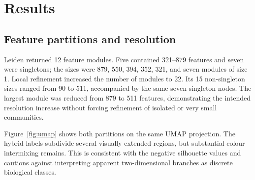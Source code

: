 \documentclass[11pt]{article}
\begin{document}
\section{Results}

\subsection{Feature partitions and resolution}

Leiden returned 12 feature modules. Five contained 321--879 features and seven were singletons; the sizes were 879, 550, 394, 352, 321, and seven modules of size 1. Local refinement increased the number of modules to 22. Its 15 non-singleton sizes ranged from 90 to 511, accompanied by the same seven singleton nodes. The largest module was reduced from 879 to 511 features, demonstrating the intended resolution increase without forcing refinement of isolated or very small communities.

Figure~\ref{fig:umap} shows both partitions on the same UMAP projection. The hybrid labels subdivide several visually extended regions, but substantial colour intermixing remains. This is consistent with the negative silhouette values and cautions against interpreting apparent two-dimensional branches as discrete biological classes.
\end{document}
